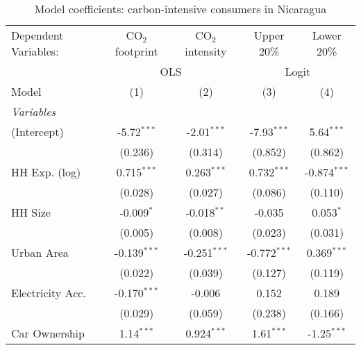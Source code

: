 
\begin{table}[htbp!]
   \centering
   \small
   \begin{adjustbox}{width = 1\textwidth, max height = 0.95\textheight, center}
      \begin{threeparttable}[b]
         \caption{\label{tab:Logit_1_NIC} Model coefficients: carbon-intensive consumers in Nicaragua}
         \begin{tabular}{lcccc}
            \tabularnewline \midrule \midrule
            Dependent Variables: & CO$_{2}$ footprint & CO$_{2}$ intensity & Upper 20\%     & Lower 20\%\\   
             & \multicolumn{2}{c}{OLS} & \multicolumn{2}{c}{Logit} \\ 
            Model                & (1)                & (2)                & (3)            & (4)\\  
            \midrule
            \emph{Variables}\\
            (Intercept)          & -5.72$^{***}$      & -2.01$^{***}$      & -7.93$^{***}$  & 5.64$^{***}$\\   
                                 & (0.236)            & (0.314)            & (0.852)        & (0.862)\\   
            HH Exp. (log)        & 0.715$^{***}$      & 0.263$^{***}$      & 0.732$^{***}$  & -0.874$^{***}$\\   
                                 & (0.028)            & (0.027)            & (0.086)        & (0.110)\\   
            HH Size              & -0.009$^{*}$       & -0.018$^{**}$      & -0.035         & 0.053$^{*}$\\   
                                 & (0.005)            & (0.008)            & (0.023)        & (0.031)\\   
            Urban Area           & -0.139$^{***}$     & -0.251$^{***}$     & -0.772$^{***}$ & 0.369$^{***}$\\   
                                 & (0.022)            & (0.039)            & (0.127)        & (0.119)\\   
            Electricity Acc.     & -0.170$^{***}$     & -0.006             & 0.152          & 0.189\\   
                                 & (0.029)            & (0.059)            & (0.238)        & (0.166)\\   
            Car Ownership        & 1.14$^{***}$       & 0.924$^{***}$      & 1.61$^{***}$   & -1.25$^{***}$\\   

\end{tabular}
\end{threeparttable}
\end{adjustbox}
\end{table}
